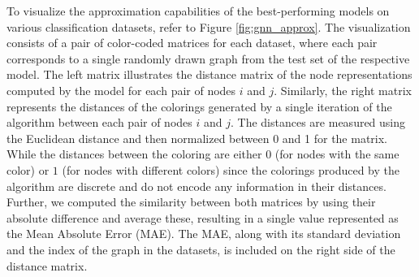 To visualize the approximation capabilities of the best-performing \gnn models on various classification datasets, refer to Figure \ref{fig:gnn_approx}. The visualization consists of a pair of color-coded matrices for each dataset, where each pair corresponds to a single randomly drawn graph from the test set of the respective \gnn model. The left matrix illustrates the distance matrix of the node representations computed by the \gnn model for each pair of nodes $i$ and $j$. Similarly, the right matrix represents the distances of the colorings generated by a single iteration of the \wl algorithm between each pair of nodes $i$ and $j$. The distances are measured using the Euclidean distance and then normalized between 0 and 1 for the \gnn matrix. While the distances between the \wl coloring are either $0$ (for nodes with the same color) or $1$ (for nodes with different colors) since the colorings produced by the \wl algorithm are discrete and do not encode any information in their distances. Further, we computed the similarity between both matrices by using their absolute difference and average these, resulting in a single value represented as the Mean Absolute Error (MAE). The MAE, along with its standard deviation and the index of the graph in the datasets, is included on the right side of the \wl distance matrix.

